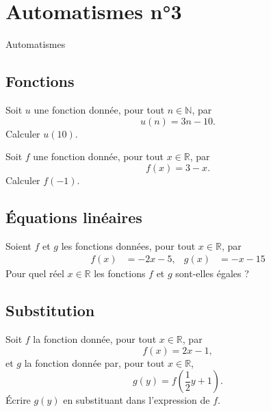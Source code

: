 \documentclass[14pt]{beamer}
\newcommand{\R}{\mathbb{R}}
\newcommand{\N}{\mathbb{N}}
\begin{document}
\section{Automatismes n°3}

\begin{frame}

\centering \huge
Automatismes

\end{frame}

\subsection{Fonctions}

\begin{frame}{1}

	Soit $u$ une fonction donnée, pour tout $n\in\N$, par
		\[ u(n) = 3n-10. \]
	Calculer $u(10)$.
\end{frame}


\begin{frame}{2}
	Soit $f$ une fonction donnée, pour tout $x\in\R$, par
		\[ f(x) = 3-x. \]
	Calculer $f(-1)$.
\end{frame}

\subsection{Équations linéaires}

\begin{frame}{3}

	Soient $f$ et $g$ les fonctions données, pour tout $x\in\R$, par
		\begin{align*}
			f(x) &= -2x-5, & g(x) &= -x - 15
		\end{align*}
	Pour quel réel $x\in\R$ les fonctions $f$ et $g$ sont-elles égales ?

\end{frame}

\subsection{Substitution}

\begin{frame}{4}

	Soit $f$ la fonction donnée, pour tout $x\in\R$, par
		\[ f(x) = 2x-1, \]
	et $g$ la fonction donnée par, pour tout $x\in\R$, 
		\[ g(y) = f\left(\dfrac12 y + 1\right). \]
	Écrire $g(y)$ en substituant dans l'expression de $f$.

\end{frame}
\end{document}

